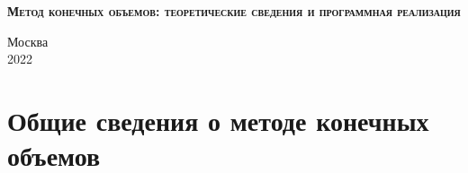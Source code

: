 \documentclass[a4paper, 11pt]{article}
\begin{document}
\begin{titlepage}
	\newpage
	
	\begin{center}
	\end{center}
	
	\vspace{8em}
	
	\begin{center}
	\end{center}
	
	\vspace{2em}
	
	\begin{center}
		\textsc{\textbf{Метод конечных объемов: теоретические сведения и программная реализация}}
	\end{center}
	
	\vspace{6em}
	
	
	
	\newbox{\lbox}
	\savebox{\lbox}{\hbox{}}
	\newlength{\maxl}
	\setlength{\maxl}{\wd\lbox}
	\hfill\parbox{11cm}{
	}
	
	
	\vspace{\fill}
	
	\begin{center}
		Москва \\ 2022
	\end{center}
	
\end{titlepage}

\setcounter{MaxMatrixCols}{20}

\section{Общие сведения о методе конечных объемов}
\end{document}
